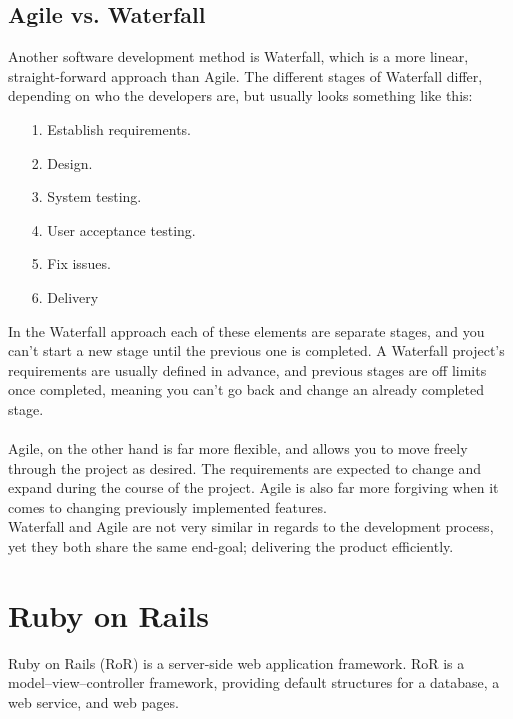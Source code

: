 \subsection{Agile vs. Waterfall}
Another software development method is Waterfall, which is a more linear, straight-forward approach than Agile. The different stages of Waterfall differ, depending on who the developers are, but usually looks something like this\cite{w-vs-a}:
\vspace{-5mm}
\begin{itemize}\setlength{\itemsep}{-5pt}
	\item[1.] Establish requirements.
	\item[2.] Design.
	\item[3.] System testing.
	\item[4.] User acceptance testing.
	\item[5.] Fix issues.
	\item[6.] Delivery
\end{itemize}
In the Waterfall approach each of these elements are separate stages, and you can't start a new stage until the previous one is completed. A Waterfall project's requirements are usually defined in advance, and previous stages are off limits once completed, meaning you can't go back and change an already completed stage.\\\\
Agile, on the other hand is far more flexible, and allows you to move freely through the project as desired. The requirements are expected to change and expand during the course of the project. Agile is also far more forgiving when it comes to changing previously implemented features.\\
Waterfall and Agile are not very similar in regards to the development process, yet they both share the same end-goal; delivering the product efficiently.\cite{smartsheet}

\section{Ruby on Rails} 
\vspace{-5mm}
Ruby on Rails (RoR) is a server-side web application framework. RoR is a model–view–controller framework, providing default structures for a database, a web service, and web pages.\cite{wiki:RoR}

